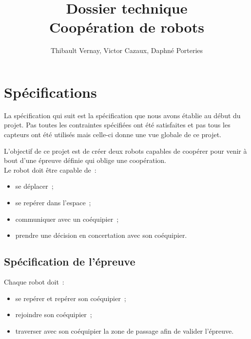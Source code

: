 \documentclass{article}
\title{Dossier technique\\Coopération de robots}
\author{Thibault Vernay, Victor Cazaux, Daphné Porteries}
\begin{document}
\maketitle

\tableofcontents

\section{Spécifications}

La spécification qui suit est la spécification que nous avons établie au début du projet. Pas toutes les contraintes spécifiées ont été satisfaites et pas tous les capteurs ont été utilisés mais celle-ci donne une vue globale de ce projet.

L'objectif de ce projet est de créer deux robots capables de coopérer pour venir à bout d'une épreuve définie qui oblige une coopération. \\

Le robot doit être capable de~: \\

\begin{itemize}
  \item se déplacer~;
  \item se repérer dans l'espace~;
  \item communiquer avec un coéquipier~;
  \item prendre une décision en concertation avec son coéquipier.
\end{itemize}

\subsection{Spécification de l'épreuve}

Chaque robot doit~: \\

\begin{itemize}
  \item se repérer et repérer son coéquipier~;
  \item rejoindre son coéquipier~;
  \item traverser avec son coéquipier la zone de passage afin de valider l'épreuve.
\end{itemize}
\end{document}
